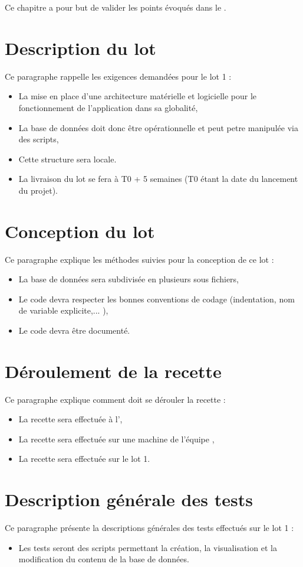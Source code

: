 	Ce chapitre a pour but de valider les points évoqués dans le \DSE.
	
\section{Description du lot}
	Ce paragraphe rappelle les exigences demandées pour le lot 1 :
	\begin{itemize}
		\item La mise en place d'une architecture matérielle et logicielle pour le fonctionnement de l'application dans sa globalité,
		\item La base de données doit donc être opérationnelle et peut petre manipulée via des scripts,
		\item Cette structure sera locale.
		\item La livraison du lot se fera à T0 + 5 semaines (T0 étant la date du lancement du projet).
	\end{itemize}
	
\section{Conception du lot}
	Ce paragraphe explique les méthodes suivies pour la conception de ce lot :
	\begin{itemize}
		\item La base de données sera subdivisée en plusieurs sous fichiers,
		\item Le code devra respecter les bonnes conventions de codage (indentation, nom de variable explicite,... ),
		\item Le code devra être documenté.
	\end{itemize}
	
\section{Déroulement de la recette}
	Ce paragraphe explique comment doit se dérouler la recette : 
	\begin{itemize}
		\item La recette sera effectuée à l'\INSA,
		\item La recette sera effectuée sur une machine de l'équipe \nomEquipe,
		\item La recette sera effectuée sur le lot 1.
	\end{itemize}

\section{Description générale des tests}
	Ce paragraphe présente la descriptions générales des tests effectués sur le lot 1 :	
	\begin{itemize}
		\item Les tests seront des scripts permettant la création, la visualisation et la modification du contenu de la base de données.
	\end{itemize}

